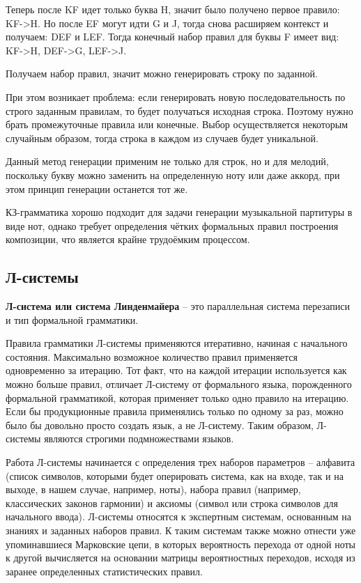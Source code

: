 Теперь после KF идет только буква H, значит было получено первое правило: KF->H. Но после EF могут идти G и J, тогда снова расширяем контекст и получаем: DEF и LEF. Тогда конечный набор правил для буквы F имеет вид: KF->H, DEF->G, LEF->J.

Получаем набор правил, значит можно генерировать строку по заданной.

При этом возникает проблема: если генерировать новую последовательность по строго заданным правилам, то будет получаться исходная строка. Поэтому нужно брать промежуточные правила или конечные. Выбор осуществляется некоторым случайным образом, тогда строка в каждом из случаев будет уникальной.

Данный метод генерации применим не только для строк, но и для мелодий, поскольку букву можно заменить на определенную ноту или даже аккорд, при этом принцип генерации останется тот же.

КЗ-грамматика хорошо подходит для задачи генерации музыкальной партитуры в виде нот, однако требует определения чётких формальных правил построения композиции, что является крайне трудоёмким процессом.

\subsection{Л-системы}

\textbf{Л-система или система Линденмайера} -- это параллельная система перезаписи и тип формальной грамматики.

Правила грамматики Л-системы применяются итеративно, начиная с начального состояния. Максимально возможное количество правил применяется одновременно за итерацию. Тот факт, что на каждой итерации используется как можно больше правил, отличает Л-систему от формального языка, порожденного формальной грамматикой, которая применяет только одно правило на итерацию. Если бы продукционные правила применялись только по одному за раз, можно было бы довольно просто создать язык, а не Л-систему. Таким образом, Л-системы являются строгими подмножествами языков.

Работа  Л-системы  \cite{l-system}  начинается  с  определения  трех  наборов  параметров -- алфавита (список символов, которыми будет оперировать система, как на входе, так и на выходе, в нашем   случае,   например,   ноты),   набора   правил   (например,   классических   законов гармонии)  и  аксиомы  (символ  или  строка  символов  для  начального  ввода). Л-системы относятся к экспертным системам, основанным на знаниях и заданных наборов правил. К таким  системам  также  можно  отнести уже  упоминавшиеся  Марковские  цепи,  в  которых вероятность  перехода  от  одной  ноты  к  другой  вычисляется  на  основании  матрицы вероятностных переходов, исходя из заранее определенных статистических правил.

